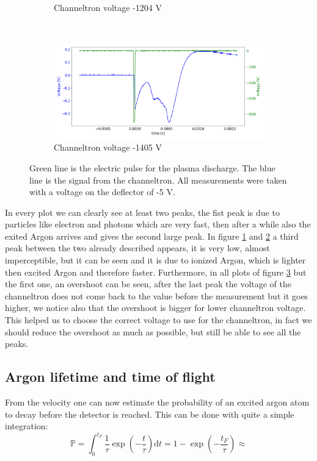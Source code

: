\documentclass[a4paper,10pt]{article}
\begin{document}
\begin{figure}[H]
\begin{subfigure}[t]{0.45 \textwidth}
    \caption{Channeltron voltage -1204 V}\label{channeltron3}
  \end{subfigure}
  ~
  \begin{subfigure}[t]{0.45 \textwidth}
    \centering
    \includegraphics[width=\textwidth]{channeltron5}
    \caption{Channeltron voltage -1405 V}\label{channeltron4}
  \end{subfigure}
  \caption{Green line is the electric pulse for the plasma discharge. The blue line is the signal from the channeltron. All measurements were taken with a voltage on the deflector of -5 V. }
  \label{channeltron}
\end{figure}
In every plot we can clearly see at least two peaks, the fist peak is due to particles like electron and photons which are very fast, then after a while also the exited Argon arrives and gives the second large peak. In figure \ref{channeltron3} and \ref{channeltron4} a third peak between the two already described appears, it is very low, almost imperceptible, but it can be seen and it is due to ionized Argon, which is lighter then excited Argon and therefore faster. Furthermore, in all plots of figure \ref{channeltron} but the first one, an overshoot can be seen, after the last peak the voltage of the channeltron does not come back to the value before the measurement but it goes higher, we notice also that the overshoot is bigger for lower channeltron voltage. This helped us to choose the correct voltage to use for the channeltron, in fact we should reduce the overshoot as much as possible, but still be able to see all the peaks.  


\subsection{Argon lifetime and time of flight}
From the velocity one can now estimate the probability of an excited argon atom to decay before the detector is reached. This can be done with quite a simple integration:
\begin{equation}
	\mathbb{P} = \int_0^{t_F} \frac{1}{\tau} \exp(-\frac{t}{\tau}) \mathrm{d}t = 1 - \exp(-\frac{t_F}{\tau}) \approx 
\end{equation}
\end{document}

